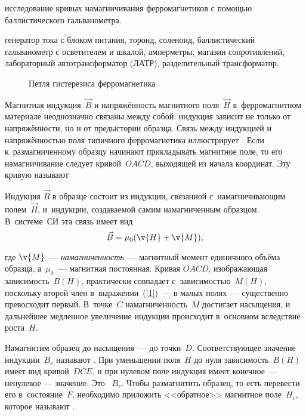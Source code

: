 
\begin{lab:aim}
	исследование кривых намагничивания ферромагнетиков с помощью баллистического гальванометра.
\end{lab:aim}

\begin{lab:equipment}
	генератор тока с блоком питания, тороид, соленоид, баллистический гальванометр с осветителем и шкалой, 
	амперметры, магазин сопротивлений, лабораторный автотрансформатор (ЛАТР), разделительный трансформатор.
\end{lab:equipment}


\begin{wrapfigure}{r}{0.4\textwidth}
	\caption{Петля гистерезиса ферромагнетика}
\end{wrapfigure}


Магнитная индукция~$\vec{B}$ и напряжённость магнитного поля~$\vec{H}$ в~ферромагнитном материале неоднозначно связаны между
собой: индукция зависит не только от напряжённости, но и от предыстории образца. Связь между индукцией и напряжённостью
поля типичного ферромагнетика иллюстрирует . Если к~размагниченному образцу начинают прикладывать магнитное поле,
то его намагничивание следует кривой~$OACD$, выходящей из начала координат. Эту кривую называют 

Индукция $\vec{B}$ в образце состоит из индукции, связанной с~намагничивающим полем~$\vec{H}$, и~индукции, создаваемой самим
намагниченным образцом. В~системе~СИ эта связь имеет вид
\begin{equation}
	\eqmark{1}
	\vec{B}=\mu_0(\v{H}+\v{M}),
\end{equation}

где $\v{M}$~--- \emph{намагниченность}~--- магнитный момент единичного объёма образца, а~$\mu_0$~--- магнитная
постоянная. Кривая $OACD$, изображающая зависимость~$B(H)$, практически совпадает с~зависимостью~$M(H)$, поскольку
второй член в~выражении~(\eqref{1})~--- в малых полях~--- существенно превосходит первый. В~точке~$C$ намагниченность~$M$
достигает насыщения, и дальнейшее медленное увеличение индукции происходит в~основном вследствие роста~$H$.

Намагнитим образец до насыщения~--- до точки~$D$. Соответствующее значение индукции~$B_s$ называют . При уменьшении поля~$H$ до нуля зависимость~$B(H)$ имеет вид кривой~$DCE$, и при нулевом поле индукция имеет
конечное~--- ненулевое --- значение. Это ~$B_r$. Чтобы размагнитить образец, то есть перевести
его в~состояние~$F$, необходимо приложить <<обратное>> магнитное поле~$H_c$, которое называют .

